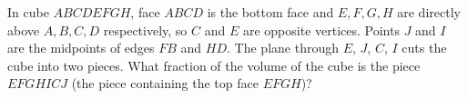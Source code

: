 In cube $ABCDEFGH$, face $ABCD$ is the bottom face and $E,F,G,H$ are directly above $A,B,C,D$ respectively, so $C$ and $E$ are opposite vertices. Points $J$ and $I$ are the midpoints of edges $FB$ and $HD$. The plane through $E$, $J$, $C$, $I$ cuts the cube into two pieces. What fraction of the volume of the cube is the piece $EFGHICJ$ (the piece containing the top face $EFGH$)?
